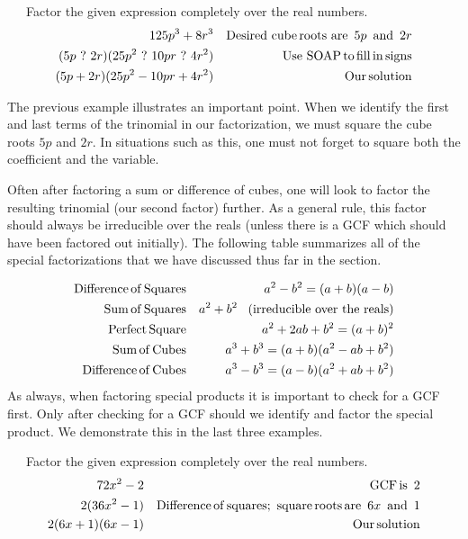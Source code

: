 \begin{example}~~~Factor the given expression completely over the real numbers.
  \begin{eqnarray*}
    125 p^3 + 8 r^3 &  & \operatorname{Desired~cube} \operatorname{roots~are~} 5 p
    \operatorname{~and~} 2 r\\
    (5 p~?~ 2 r) (25 p^2 ~?~ 10 pr ~?~ 4r^2) &  & \operatorname{Use~SOAP} \operatorname{to} \operatorname{fill} \operatorname{in} \operatorname{signs}\\
    (5 p + 2 r) (25 p^2 - 10 pr + 4 r^2) &  & \operatorname{Our} \operatorname{solution}
  \end{eqnarray*}
\end{example}

The previous example illustrates an important point. When we identify the
first and last terms of the trinomial in our factorization, we must square the cube roots $5 p$ and $2 r$.
In situations such as this, one must not forget to square both the coefficient and the variable.\pp %

Often after factoring a sum or difference of cubes, one will look to factor the resulting trinomial (our second factor) further. As a general rule, this factor should always be irreducible over the reals (unless there is a GCF which should have been factored out
initially).
\newpage
The following table summarizes all of the special factorizations that we have discussed thus far in the section.

\begin{center}
  {}
\end{center}
\begin{eqnarray*}
  \operatorname{Difference} \operatorname{of} \operatorname{Squares} &  & a^2 - b^2 = (a + b) (a -
  b)\\
  \operatorname{Sum} \operatorname{of} \operatorname{Squares} &  & a^2 + b^2~~\operatorname{(irreducible~over~the~reals)}\\
  \operatorname{Perfect} \operatorname{Square} &  & a^2 + 2 a b + b^2 = (a + b)^2\\
  \operatorname{Sum} \operatorname{of} \operatorname{Cubes} &  & a^3 + b^3 = (a + b) (a^2 - a b +
  b^2)\\
  \operatorname{Difference} \operatorname{of} \operatorname{Cubes} &  & a^3 - b^3 = (a - b) (a^2 + a b
  + b^2)
\end{eqnarray*}
As always, when factoring special products it is important to check for a GCF
first. Only after checking for a GCF should we identify and factor the special product.
We demonstrate this in the last three examples.
\begin{example}~~~Factor the given expression completely over the real numbers.
  \begin{eqnarray*}
    72 x^2 - 2 &  & \operatorname{GCF} \operatorname{is~} 2\\
    2 (36 x^2 - 1) &  & \operatorname{Difference} \operatorname{of} \operatorname{squares};
    \operatorname{~square} \operatorname{roots} \operatorname{are~} 6 x \operatorname{~and~} 1\\
    2 (6 x + 1) (6 x - 1) &  & \operatorname{Our} \operatorname{solution}
  \end{eqnarray*}
\end{example}


